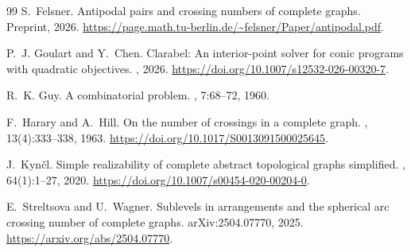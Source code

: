 \documentclass{article}
\theoremstyle{plain}
\theoremstyle{definition}
\theoremstyle{remark}
\begin{document}
\begin{thebibliography}{99}
S.~Felsner.
\newblock Antipodal pairs and crossing numbers of complete graphs.
\newblock Preprint, 2026.
\newblock
\url{https://page.math.tu-berlin.de/~felsner/Paper/antipodal.pdf}.

P.~J. Goulart and Y.~Chen.
\newblock Clarabel: An interior-point solver for conic programs with
  quadratic objectives.
, 2026.
\newblock \url{https://doi.org/10.1007/s12532-026-00320-7}.

R.~K. Guy.
\newblock A combinatorial problem.
, 7:68--72, 1960.

F.~Harary and A.~Hill.
\newblock On the number of crossings in a complete graph.
, 13(4):333--338, 1963.
\newblock \url{https://doi.org/10.1017/S0013091500025645}.

J.~Kyn\v{c}l.
\newblock Simple realizability of complete abstract topological graphs
  simplified.
, 64(1):1--27, 2020.
\newblock \url{https://doi.org/10.1007/s00454-020-00204-0}.

E.~Streltsova and U.~Wagner.
\newblock Sublevels in arrangements and the spherical arc crossing
  number of complete graphs.
\newblock arXiv:2504.07770, 2025.
\newblock \url{https://arxiv.org/abs/2504.07770}.

\end{thebibliography}
\end{document}
